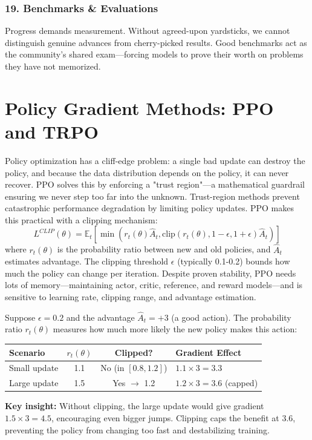\documentclass[12pt,a4paper]{report}
\theoremstyle{definition}
\begin{document}
\subsubsection*{19. Benchmarks \& Evaluations}
Progress demands measurement. Without agreed-upon yardsticks, we cannot distinguish genuine advances from cherry-picked results. Good benchmarks act as the community's shared exam---forcing models to prove their worth on problems they have not memorized.

\section{Policy Gradient Methods: PPO and TRPO}
Policy optimization has a cliff-edge problem: a single bad update can destroy the policy, and because the data distribution depends on the policy, it can never recover. PPO solves this by enforcing a "trust region"—a mathematical guardrail ensuring we never step too far into the unknown. Trust-region methods prevent catastrophic performance degradation by limiting policy updates. PPO \cite{schulman2017proximal} makes this practical with a clipping mechanism:
\begin{equation}
L^{CLIP}(\theta) = \mathbb{E}_t \left[ \min(r_t(\theta) \hat{A}_t, \text{clip}(r_t(\theta), 1-\epsilon, 1+\epsilon) \hat{A}_t) \right]
\end{equation}
where $r_t(\theta)$ is the probability ratio between new and old policies, and $\hat{A}_t$ estimates advantage. The clipping threshold $\epsilon$ (typically 0.1-0.2) bounds how much the policy can change per iteration. Despite proven stability, PPO needs lots of memory---maintaining actor, critic, reference, and reward models---and is sensitive to learning rate, clipping range, and advantage estimation.

\begin{tcolorbox}[colback=gray!5!white, colframe=gray!60!black, title=\textbf{Worked Example: PPO Clipping in Action}]
\small
Suppose $\epsilon = 0.2$ and the advantage $\hat{A}_t = +3$ (a good action). The probability ratio $r_t(\theta)$ measures how much more likely the new policy makes this action:

\begin{center}
\begin{tabular}{lccl}
\toprule
\textbf{Scenario} & $r_t(\theta)$ & \textbf{Clipped?} & \textbf{Gradient Effect} \\
\midrule
Small update & 1.1 & No (in $[0.8, 1.2]$) & $1.1 \times 3 = 3.3$ \\
Large update & 1.5 & Yes $\rightarrow$ 1.2 & $1.2 \times 3 = 3.6$ (capped) \\
\bottomrule
\end{tabular}
\end{center}

\textbf{Key insight:} Without clipping, the large update would give gradient $1.5 \times 3 = 4.5$, encouraging even bigger jumps. Clipping caps the benefit at $3.6$, preventing the policy from changing too fast and destabilizing training.
\end{tcolorbox}
\end{document}
